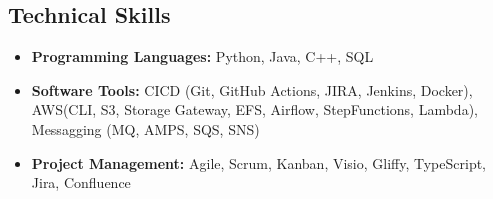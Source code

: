 \vspace{-1em}
\subsection*{\color{CarianBlue} \Large Technical Skills \crulefill{1pt}}

\begin{itemize}[leftmargin=1em,noitemsep]
    \item \textbf{Programming Languages:} Python, Java, C++, SQL
    \item \textbf{Software Tools:} CICD (Git, GitHub Actions, JIRA, Jenkins, Docker), AWS(CLI, S3, Storage Gateway, EFS, Airflow, StepFunctions, Lambda), Messagging (MQ, AMPS, SQS, SNS)
    \item \textbf{Project Management:} Agile, Scrum, Kanban, Visio, Gliffy, TypeScript, Jira, Confluence
\end{itemize}

